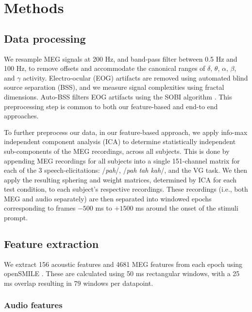 \documentclass[utf8]{frontiersSCNS} %
\begin{document}
\section{Methods}


\subsection{Data processing}

We resample MEG signals at 200 Hz, and band-pass filter between 0.5 Hz and 100 Hz, to remove offsets and accommodate the canonical ranges of $\delta$, $\theta$, $\alpha$, $\beta$, and $\gamma$ activity. Electro-ocular (EOG) artifacts are removed using automated blind source separation (BSS), and we measure signal complexities using fractal dimensions. Auto-BSS filters EOG artifacts using the SOBI algorithm \cite{eog}. This preprocessing step is common to both our feature-based and end-to end approaches.

To further preprocess our data, in our feature-based approach, we apply info-max independent component analysis (ICA) \cite{Bell1995} to determine statistically independent sub-components of the MEG recordings, across all subjects. This is done by appending MEG recordings for all subjects into a single 151-channel matrix for each of the 3 speech-elicitations: /{\em pah}/, /{\em pah tah kah}/, and the VG task. We then apply the resulting sphering and weight matrices, determined by ICA for each test condition, to each subject's respective recordings. These recordings (i.e., both MEG and audio separately) are then separated into windowed epochs corresponding to frames $-500$ ms to $+1500$ ms around the onset of the stimuli prompt.

\subsection{Feature extraction}

We extract 156 acoustic features and 4681 MEG features from each epoch using openSMILE \cite{Eyben13-RDI}. These are calculated using 50 ms rectangular windows, with a 25 ms overlap resulting in 79 windows per datapoint.

\subsubsection{Audio features}
\end{document}
